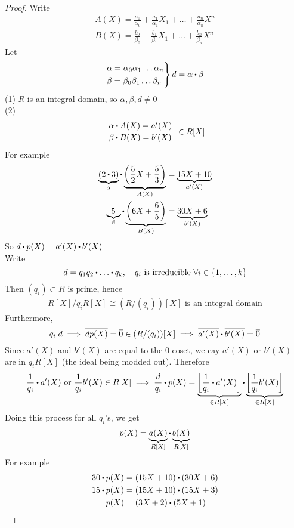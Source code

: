\documentclass[../Main.tex]{subfiles}
\begin{document}
\begin{proof}
	Write
	\begin{align*}
	A(X)=\frac{a_0}{\alpha_0}+\frac{a_1}{\alpha_1}X_1+\dots +\frac{a_n}{\alpha_n}X^n\\
	B(X)= \frac{b_0}{\beta_0}+\frac{b_1}{\beta_1}X_1+\dots +\frac{b_n}{\beta_n}X^n
	\end{align*}
	Let 
	\[\begin{rcases*}
	\alpha = \alpha_0\alpha_1\dots\alpha_n\\
	\beta = \beta_0\beta_1\dots\beta_n
	\end{rcases*}d=\alpha\rdot \beta\]
	(1) $R$ is an integral domain, so $\alpha,\beta,d\ne 0$\\
	(2) 
	\[\begin{array}{l}
		\alpha\rdot A(X)=a'(X)\\[2pt]
		\beta\rdot B(X)=b'(X)
	\end{array}\in R[X]\]
	For example
	\begin{align*}
	\underbrace{(2\rdot 3)}_{\alpha}\rdot \underbrace{\left(\frac{5}{2}X+\frac{5}{3}\right)}_{A(X)}&=\underbrace{15X+10}_{a'(X)}\\ 
	\underbrace{5}_{\beta}\rdot \underbrace{\left(6X+\frac{6}{5}\right)}_{B(X)} &= \underbrace{30X+6}_{b'(X)}
	\end{align*}
	So $d\rdot p(X)=a'(X)\rdot b'(X)$\\
	Write
	\[d=q_1q_2\rdot \dots\rdot q_k,\quad q_i \text{ is irreducible }\forall i\in \{1,\dots,k\} \]
	Then $(q_i)\subset R$ is prime, hence
	\begin{align*}
	R[X]/q_iR[X] \cong (R/(q_i))[X] \text{ is an integral domain}
	\end{align*}
	Furthermore,
	\[q_i|d\implies \obar{dp(X)}=\obar{0} \in (R/(q_i))[X] \implies \obar{a'(X)}\rdot \obar{ b'(X)} =\obar{0}\]
	Since $a'(X)$ and $b'(X)$ are equal to the $0$ coset, we cay $a'(X)$ or $b'(X)$ are in $q_iR[X]$ (the ideal being modded out). Therefore
	\[\frac{1}{q_i}\rdot a'(X) \text{ or } \frac{1}{q_i}b'(X) \in R[X] \implies \frac{d}{q_i}\rdot p(X)=\underbrace{\left[\frac{1}{q_i}\rdot a'(X)\right]}_{\in R[X]}\rdot \underbrace{\left[\frac{1}{q_i}b'(X)\right]}_{\in R[X]} \]
	Doing this process for all $q_i$'s, we get
	\[p(X)=\underbrace{a(X)}_{R[X]}\rdot \underbrace{b(X)}_{R[X]}\]
	For example
	\begin{align*}
	30\rdot p(X)&=(15X+10)\rdot (30X+6)\\
	15\rdot p(X)&=(15X+10)\rdot (15X+3)\\
	p(X) &= (3X+2)\rdot (5X+1)
	\end{align*}
\end{proof}
\end{document}

